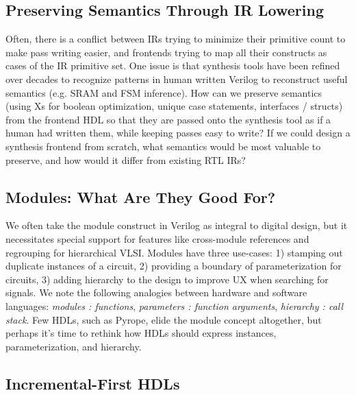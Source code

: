 \documentclass[sigplan,review,nonacm,9pt]{acmart}
\begin{document}
\subsection{Preserving Semantics Through IR Lowering}


Often, there is a conflict between IRs trying to minimize their primitive count to make pass writing easier, and frontends trying to map all their constructs as cases of the IR primitive set.
One issue is that synthesis tools have been refined over decades to recognize patterns in human written Verilog to reconstruct useful semantics (e.g. SRAM and FSM inference).
How can we preserve semantics (using Xs for boolean optimization, unique case statements, interfaces / structs) from the frontend HDL so that they are passed onto the synthesis tool as if a human had written them, while keeping passes easy to write?
If we could design a synthesis frontend from scratch, what semantics would be most valuable to preserve, and how would it differ from existing RTL IRs?

\subsection{Modules: What Are They Good For?}

We often take the module construct in Verilog as integral to digital design, but it necessitates special support for features like cross-module references and regrouping for hierarchical VLSI.
Modules have three use-cases: 1) stamping out duplicate instances of a circuit, 2) providing a boundary of parameterization for circuits, 3) adding hierarchy to the design to improve UX when searching for signals.
We note the following analogies between hardware and software languages: \textit{modules : functions}, \textit{parameters : function arguments}, \textit{hierarchy : call stack}.
Few HDLs, such as Pyrope\cite{pyrope}, elide the module concept altogether, but perhaps it's time to rethink how HDLs should express instances, parameterization, and hierarchy.

\subsection{Incremental-First HDLs}
\end{document}

